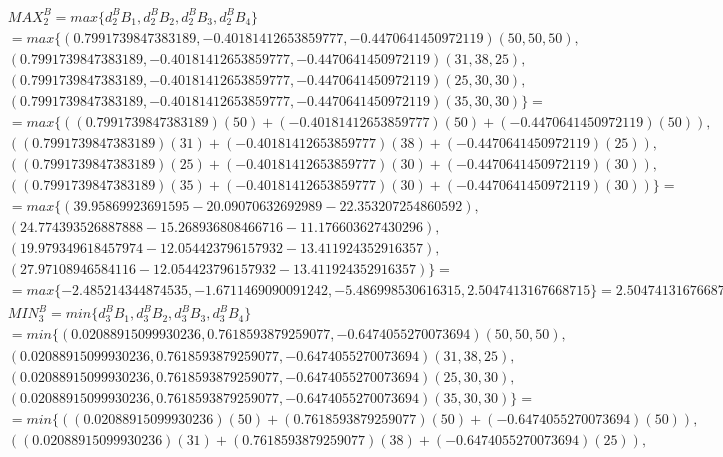 \documentclass[a4paper]{article}
\begin{document}
	\begin{align*}
		&MAX_2^B = max\{d_2^B B_1, d_2^B B_2, d_2^B B_3, d_2^B B_4\} 
		\\
		&= max\{
		(0.7991739847383189, -0.40181412653859777, -0.4470641450972119) (50, 50, 50), 
		\\&(0.7991739847383189, -0.40181412653859777, -0.4470641450972119) (31, 38, 25), 
		\\&(0.7991739847383189, -0.40181412653859777, -0.4470641450972119) (25, 30, 30), 
		\\&(0.7991739847383189, -0.40181412653859777, -0.4470641450972119) (35, 30, 30)\}=
		\\
		&= max\{
		((0.7991739847383189)(50) + (-0.40181412653859777)(50) + (-0.4470641450972119)(50)), 
		\\&((0.7991739847383189)(31) + (-0.40181412653859777)(38) + (-0.4470641450972119)(25)), 
		\\&((0.7991739847383189)(25) + (-0.40181412653859777)(30) + (-0.4470641450972119)(30)), 
		\\&((0.7991739847383189)(35) + (-0.40181412653859777)(30) + (-0.4470641450972119)(30))\}=
		\\
		&=max\{
		(39.95869923691595 -20.09070632692989  -22.353207254860592), 
		\\&(24.774393526887888 -15.268936808466716 -11.176603627430296), 
		\\&(19.979349618457974 -12.054423796157932 -13.411924352916357), 
		\\&(27.97108946584116 -12.054423796157932 -13.411924352916357)\}=
		\\&=max\{
		-2.485214344874535, 
		-1.6711469090091242, 
		-5.486998530616315, 
		2.5047413167668715\} = 2.5047413167668715
		\\
		&MIN_3^B = min\{d_3^B B_1, d_3^B B_2, d_3^B B_3, d_3^B B_4\} 
		\\
		&= min\{
		(0.02088915099930236, 0.7618593879259077, -0.6474055270073694) (50, 50, 50), 
		\\&(0.02088915099930236, 0.7618593879259077, -0.6474055270073694) (31, 38, 25), 
		\\&(0.02088915099930236, 0.7618593879259077, -0.6474055270073694) (25, 30, 30), 
		\\&(0.02088915099930236, 0.7618593879259077, -0.6474055270073694) (35, 30, 30)\}=
		\\
		&= min\{
		((0.02088915099930236)(50) + (0.7618593879259077)(50) + (-0.6474055270073694)(50)), 
		\\&((0.02088915099930236)(31) + (0.7618593879259077)(38) + (-0.6474055270073694)(25)), 

\end{align*}
\end{document}
